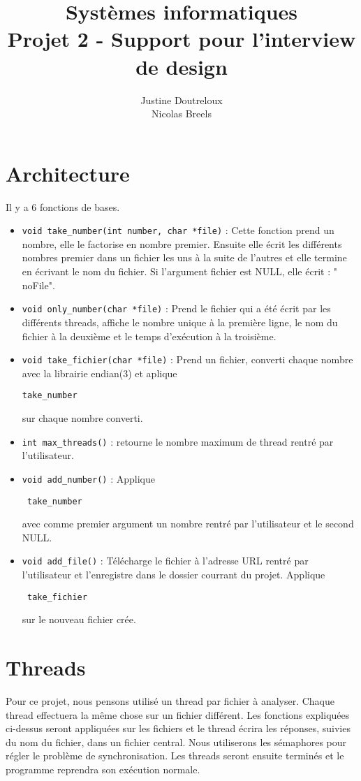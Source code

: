 \documentclass[11pt,a4paper]{article}
\author{Justine Doutreloux \\
Nicolas Breels}
\title{Systèmes informatiques\\
Projet 2 - Support pour l'interview de design}
\begin{document}
\maketitle
\section{Architecture}
Il y a 6 fonctions de bases.
\begin{itemize}
\item \lstinline|void take_number(int number, char *file)| : Cette fonction prend un nombre, elle le factorise en nombre premier. Ensuite elle écrit les différents nombres premier dans un fichier les uns à la suite de l'autres et elle termine en écrivant le nom du fichier. Si l'argument fichier est NULL, elle écrit : " noFile".

\item \lstinline|void only_number(char *file)| : Prend le fichier qui a été écrit par les différents threads, affiche le nombre unique à la première ligne, le nom du fichier à la deuxième et le temps d'exécution à la troisième.

\item \lstinline|void take_fichier(char *file)| : Prend un fichier, converti chaque nombre avec la librairie endian(3) et aplique \begin{verbatim}take_number \end{verbatim} sur chaque nombre converti.

\item \lstinline|int max_threads()| : retourne le nombre maximum de thread rentré par l'utilisateur.

\item \lstinline|void add_number()| : Applique \begin{verbatim} take_number \end{verbatim} avec comme premier argument un nombre rentré par l'utilisateur et le second NULL.

\item \lstinline|void add_file()| : Télécharge le fichier à l'adresse URL rentré par l'utilisateur et l'enregistre dans le dossier courrant du projet. Applique \begin{verbatim} take_fichier \end{verbatim} sur le nouveau fichier crée.
\end{itemize}
\section{Threads}
Pour ce projet, nous pensons utilisé un thread par fichier à analyser. Chaque thread effectuera la même chose sur un fichier différent. Les fonctions expliquées ci-dessus seront appliquées sur les fichiers et le thread écrira les réponses, suivies du nom du fichier, dans un fichier central. Nous utiliserons les sémaphores pour régler le problème de synchronisation. Les threads seront ensuite terminés et le programme reprendra son exécution normale. 
\end{document}
